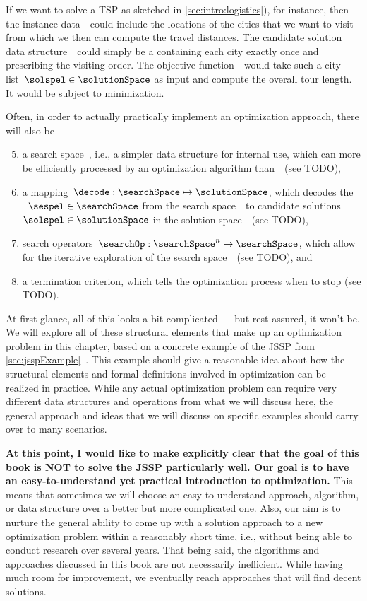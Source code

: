 %
If we want to solve a \gls{TSP} as sketched in \autoref{sec:intro:logistics}), for instance, then the instance data~\instance\ could include the locations of the cities that we want to visit from which we then can compute the travel distances.
The candidate solution data structure~\solutionSpace\ could simply be a  containing each city exactly once and prescribing the visiting order.
The objective function~\objf\ would take such a city list~$\solspel\in\solutionSpace$ as input and compute the overall tour length.
It would be subject to minimization.

Often, in order to actually practically implement an optimization approach, there will also be%
%
\begin{enumerate}%
\setcounter{enumi}{4}%
%
\item a search space~\searchSpace, i.e., a simpler data structure for internal use, which can more be efficiently processed by an optimization algorithm than~\solutionSpace\ (see TODO),%
%
\item a mapping~$\decode:\searchSpace\mapsto\solutionSpace$, which decodes the ~$\sespel\in\searchSpace$ from the search space~\searchSpace\ to candidate solutions~$\solspel\in\solutionSpace$ in the solution space~\solutionSpace\ (see TODO),%
%
\item search operators~$\searchOp:\searchSpace^n\mapsto\searchSpace$, which allow for the iterative exploration of the search space~\searchSpace\ (see TODO), and%
%
\item a termination criterion, which tells the optimization process when to stop (see TODO).%
%
\end{enumerate}%
%
At first glance, all of this looks a bit complicated --- but rest assured, it won't be.
We will explore all of these structural elements that make up an optimization problem in this chapter, based on a concrete example of the \acrfull{JSSP} from \autoref{sec:jsspExample}~\cite{GLLRK1979OAAIDSASAS,LLRKS1993SASAAC,L1982RRITTOMS,T1993BFBSP,BDP1996TJSSPCANST}.
This example should give a reasonable idea about how the structural elements and formal definitions involved in optimization can be realized in practice.
While any actual optimization problem can require very different data structures and operations from what we will discuss here, the general approach and ideas that we will discuss on specific examples should carry over to many scenarios.

\textbf{At this point, I would like to make explicitly clear that the goal of this book is NOT to solve the \gls{JSSP} particularly well. Our goal is to have an easy-to-understand yet practical introduction to optimization.}
This means that sometimes we will choose an easy-to-understand approach, algorithm, or data structure over a better but more complicated one.
Also, our aim is to nurture the general ability to come up with a solution approach to a new optimization problem within a reasonably short time, i.e., without being able to conduct research over several years.
That being said, the algorithms and approaches discussed in this book are not necessarily inefficient.
While having much room for improvement, we eventually reach approaches that will find decent solutions.%
\endhsection%
%
